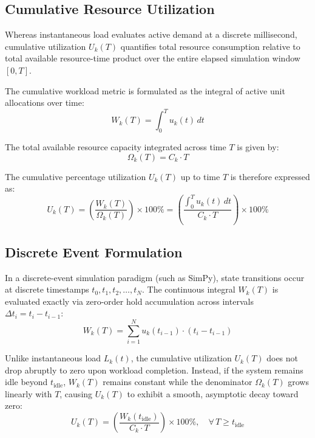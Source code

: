 \subsection{Cumulative Resource Utilization}
Whereas instantaneous load evaluates active demand at a discrete millisecond, cumulative utilization $U_{k}(T)$ quantifies total resource consumption relative to total available resource-time product over the entire elapsed simulation window $[0, T]$. 

The cumulative workload metric is formulated as the integral of active unit allocations over time:
\begin{equation}
    W_k(T) = \int_{0}^{T} u_k(t) \, dt
\end{equation}

The total available resource capacity integrated across time $T$ is given by:
\begin{equation}
    \Omega_k(T) = C_k \cdot T
\end{equation}

The cumulative percentage utilization $U_k(T)$ up to time $T$ is therefore expressed as:
\begin{equation}
    U_k(T) = \left( \frac{W_k(T)}{\Omega_k(T)} \right) \times 100\% = \left( \frac{\int_{0}^{T} u_k(t) \, dt}{C_k \cdot T} \right) \times 100\%
\end{equation}

\subsection{Discrete Event Formulation}
In a discrete-event simulation paradigm (such as SimPy), state transitions occur at discrete timestamps $t_0, t_1, t_2, \dots, t_N$. The continuous integral $W_k(T)$ is evaluated exactly via zero-order hold accumulation across intervals $\Delta t_i = t_i - t_{i-1}$:
\begin{equation}
    W_k(T) = \sum_{i=1}^{N} u_k(t_{i-1}) \cdot (t_i - t_{i-1})
\end{equation}

Unlike instantaneous load $L_k(t)$, the cumulative utilization $U_k(T)$ does not drop abruptly to zero upon workload completion. Instead, if the system remains idle beyond $t_{\text{idle}}$, $W_k(T)$ remains constant while the denominator $\Omega_k(T)$ grows linearly with $T$, causing $U_k(T)$ to exhibit a smooth, asymptotic decay toward zero:
\begin{equation}
    U_k(T) = \left( \frac{W_k(t_{\text{idle}})}{C_k \cdot T} \right) \times 100\%, \quad \forall \, T \ge t_{\text{idle}}
\end{equation}
